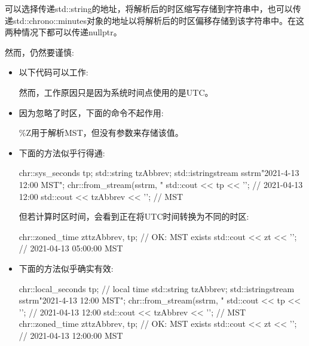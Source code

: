 可以选择传递std::string的地址，将解析后的时区缩写存储到字符串中，也可以传递std::chrono::minutes对象的地址以将解析后的时区偏移存储到该字符串中。在这两种情况下都可以传递nullptr。

然而，仍然要谨慎:

\begin{itemize}
\item
以下代码可以工作:


然而，工作原因只是因为系统时间点使用的是UTC。

\item
因为忽略了时区，下面的命令不起作用:


\%Z用于解析MST，但没有参数来存储该值。

\item
下面的方法似乎行得通:

\begin{cpp}
chr::sys_seconds tp;
std::string tzAbbrev;
std::istringstream sstrm{"2021-4-13 12:00 MST"};
chr::from_stream(sstrm, "%
std::cout << tp << '\n'; // 2021-04-13 12:00
std::cout << tzAbbrev << '\n'; // MST
\end{cpp}

但若计算时区时间，会看到正在将UTC时间转换为不同的时区:

\begin{cpp}
chr::zoned_time zt{tzAbbrev, tp}; // OK: MST exists
std::cout << zt << '\n'; // 2021-04-13 05:00:00 MST
\end{cpp}

\item
下面的方法似乎确实有效:

\begin{cpp}
chr::local_seconds tp; // local time
std::string tzAbbrev;
std::istringstream sstrm{"2021-4-13 12:00 MST"};
chr::from_stream(sstrm, "%
std::cout << tp << '\n'; // 2021-04-13 12:00
std::cout << tzAbbrev << '\n'; // MST
chr::zoned_time zt{tzAbbrev, tp}; // OK: MST exists
std::cout << zt << '\n'; // 2021-04-13 12:00:00 MST
\end{cpp}


\end{itemize}
